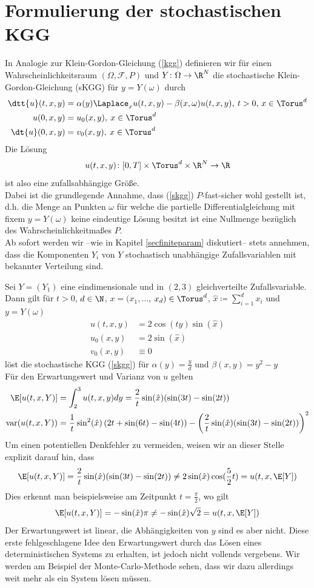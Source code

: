 \section{Formulierung der stochastischen KGG}
In Analogie zur Klein-Gordon-Gleichung (\ref{kgg}) definieren wir für einen Wahrscheinlichkeitsraum $(\Omega,\mathcal{F},P)$ und $Y\colon\Omega\to\R^N$ die stochastische Klein-Gordon-Gleichung (sKGG) für $y=Y(\omega)$ durch
\begin{align}
\label{skgg}
\dtt{u}(t,x,y)&=\alpha(y) \Laplace_x u(t,x,y) - \beta(x,\omega)u(t,x,y), \: t>0, \, x\in \Torus^d\\
u(0,x,y)&=u_0(x,y), \: x\in \Torus^d\\
\dt{u}(0,x,y)&=v_0(x,y), \: x\in \Torus^d
\end{align}
Die Lösung \[u(t,x,y)\colon [0,T]\times\Torus^d\times \R^N\to\R\] ist also eine zufallsabhängige Größe.\\
Dabei ist die grundlegende Annahme, dass (\ref{skgg}) $P$-fast-sicher wohl gestellt ist, d.h. die Menge an Punkten $\omega$ für welche die partielle Differentialgleichung mit fixem $y=Y(\omega)$ keine eindeutige Lösung besitzt ist eine Nullmenge bezüglich des Wahrscheinlichkeitmaßes $P$.\\
Ab sofort werden wir --wie in Kapitel \ref{secfiniteparam} diskutiert-- stets annehmen, dass die Komponenten $Y_i$ von $Y$ stochastisch unabhängige Zufallsvariablen mit bekannter Verteilung sind.
\begin{mathbsp}
Sei $Y=(Y_1)$ eine eindimensionale und in $(2,3)$ gleichverteilte Zufallsvariable. Dann gilt für $t>0$, $d\in\N$, $x=(x_1,\dots$, $x_d)\in\Torus^d$, $\hat{x}\coloneqq \sum_{i=1}^d x_i$ und $y=Y(\omega)$
\begin{align*}
u(t,x,y)&=2\cos(ty)\sin(\hat{x})\\
u_0(x,y)&=2\sin(\hat{x})\\
v_0(x,y)&\equiv 0
\end{align*}
löst die stochastische KGG (\ref{skgg}) für $\alpha(y)=\frac{y}{d}$ und $\beta(x,y)=y^2-y$\\
Für den Erwartungswert und Varianz von $u$ gelten
\begin{align*}
\E[u(t,x,Y)]&=\int_2^3u(t,x,y)dy=\frac{2}{t}\sin(\hat{x})(\sin(3t) - \sin(2t))\\
\text{var}(u(t,x,Y))&=\frac{1}{t}\sin^2(\hat{x})\left(2t + \sin(6t) - \sin(4t)\right)- \left(\frac{2}{t}\sin(\hat{x})(\sin(3t) - \sin(2t))\right)^2
\end{align*}
Um einen potentiellen Denkfehler zu vermeiden, weisen wir an dieser Stelle explizit darauf hin, dass 
\[\E[u(t,x,Y)]=\frac{2}{t}\sin(\hat{x})(\sin(3t) - \sin(2t))\neq 2\sin(\hat{x})\cos(\frac{5}{2}t)=u(t,x,\E[Y])\]
Dies erkennt man beispielsweise am Zeitpunkt $t=\frac{\pi}{2}$, wo gilt
\[\E[u(t,x,Y)]=-\sin(\hat{x})\pi \neq -\sin(\hat{x})\sqrt{2}=u(t,x,\E[Y])\]
Der Erwartungswert ist linear, die Abhängigkeiten von $y$ sind es aber nicht. Diese erste fehlgeschlagene Idee den Erwartungswert durch das Lösen eines deterministischen Systems zu erhalten, ist jedoch nicht vollends vergebens. Wir werden am Beispiel der Monte-Carlo-Methode sehen, dass wir dazu allerdings weit mehr als ein System lösen müssen.
\end{mathbsp}
